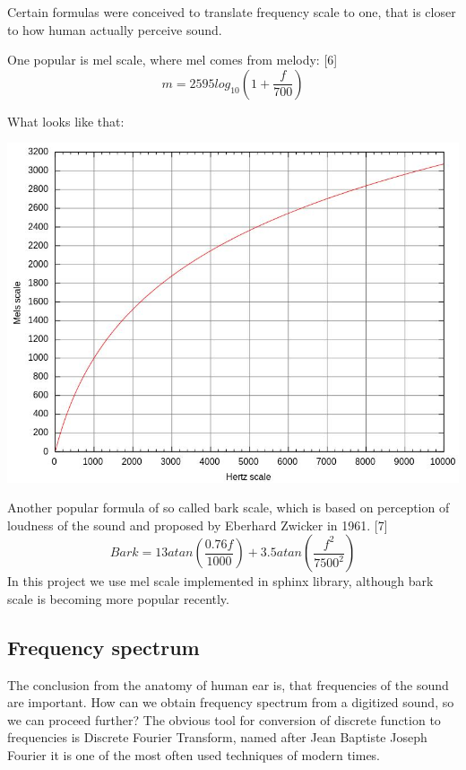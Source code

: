 \documentclass[12pt,a4paper,english]{article}
\begin{document}
Certain formulas were conceived to translate frequency scale to one, that is closer to how human actually perceive sound. \newline

One popular is mel scale, where mel comes from melody: [6] \newline
\begin{equation}
    m = 2595log_{10}(1 + \frac{f}{700})
\end{equation}
	
What looks like that:
\begin{center}
    \includegraphics[scale=0.3]{mel_scale.jpg}
\end {center}

Another popular formula of so called bark scale, which is based on perception of loudness of the sound and proposed by Eberhard Zwicker in 1961. [7] \newline
\begin{equation}
    Bark = 13 atan(\frac{0.76f}{1000}) + 3.5 atan(\frac{f^2}{7500^2})
\end{equation}
In this project we use mel scale implemented in sphinx library, although bark scale is becoming more popular recently.

\newpage
\subsection{Frequency spectrum}

The conclusion from the anatomy of human ear is, that frequencies of the sound are important.
How can we obtain frequency spectrum from a digitized sound, so we can proceed further? \newline
The obvious tool for conversion of discrete function to frequencies is Discrete Fourier Transform, named after Jean Baptiste Joseph Fourier it is one of the most often used techniques of modern times. \newline
\end{document}
